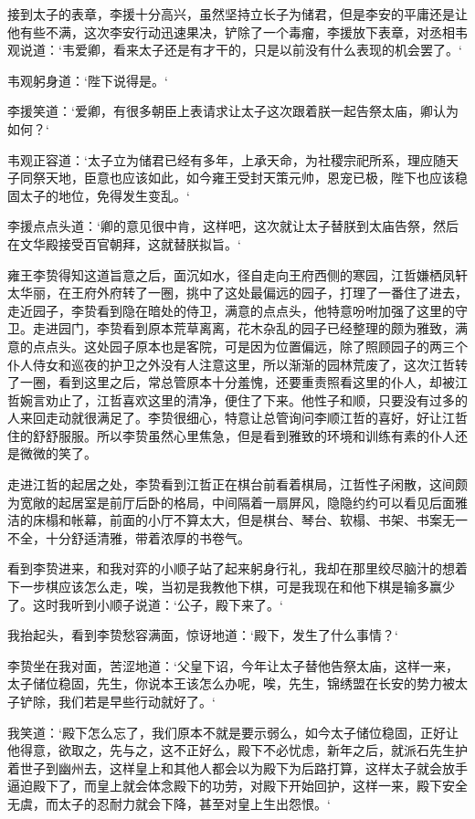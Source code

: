 接到太子的表章，李援十分高兴，虽然坚持立长子为储君，但是李安的平庸还是让他有些不满，这次李安行动迅速果决，铲除了一个毒瘤，李援放下表章，对丞相韦观说道：‘韦爱卿，看来太子还是有才干的，只是以前没有什么表现的机会罢了。‘

韦观躬身道：‘陛下说得是。‘

李援笑道：‘爱卿，有很多朝臣上表请求让太子这次跟着朕一起告祭太庙，卿认为如何？‘

韦观正容道：‘太子立为储君已经有多年，上承天命，为社稷宗祀所系，理应随天子同祭天地，臣意也应该如此，如今雍王受封天策元帅，恩宠已极，陛下也应该稳固太子的地位，免得发生变乱。‘

李援点点头道：‘卿的意见很中肯，这样吧，这次就让太子替朕到太庙告祭，然后在文华殿接受百官朝拜，这就替朕拟旨。‘

雍王李贽得知这道旨意之后，面沉如水，径自走向王府西侧的寒园，江哲嫌栖凤轩太华丽，在王府外府转了一圈，挑中了这处最偏远的园子，打理了一番住了进去，走近园子，李贽看到隐在暗处的侍卫，满意的点点头，他特意吩咐加强了这里的守卫。走进园门，李贽看到原本荒草离离，花木杂乱的园子已经整理的颇为雅致，满意的点点头。这处园子原本也是客院，可是因为位置偏远，除了照顾园子的两三个仆人侍女和巡夜的护卫之外没有人注意这里，所以渐渐的园林荒废了，这次江哲转了一圈，看到这里之后，常总管原本十分羞愧，还要重责照看这里的仆人，却被江哲婉言劝止了，江哲喜欢这里的清净，便住了下来。他性子和顺，只要没有过多的人来回走动就很满足了。李贽很细心，特意让总管询问李顺江哲的喜好，好让江哲住的舒舒服服。所以李贽虽然心里焦急，但是看到雅致的环境和训练有素的仆人还是微微的笑了。

走进江哲的起居之处，李贽看到江哲正在棋台前看着棋局，江哲性子闲散，这间颇为宽敞的起居室是前厅后卧的格局，中间隔着一扇屏风，隐隐约约可以看见后面雅洁的床榻和帐幕，前面的小厅不算太大，但是棋台、琴台、软榻、书架、书案无一不全，十分舒适清雅，带着浓厚的书卷气。

看到李贽进来，和我对弈的小顺子站了起来躬身行礼，我却在那里绞尽脑汁的想着下一步棋应该怎么走，唉，当初是我教他下棋，可是我现在和他下棋是输多赢少了。这时我听到小顺子说道：‘公子，殿下来了。‘

我抬起头，看到李贽愁容满面，惊讶地道：‘殿下，发生了什么事情？‘

李贽坐在我对面，苦涩地道：‘父皇下诏，今年让太子替他告祭太庙，这样一来，太子储位稳固，先生，你说本王该怎么办呢，唉，先生，锦绣盟在长安的势力被太子铲除，我们若是早些行动就好了。‘

我笑道：‘殿下怎么忘了，我们原本不就是要示弱么，如今太子储位稳固，正好让他得意，欲取之，先与之，这不正好么，殿下不必忧虑，新年之后，就派石先生护着世子到幽州去，这样皇上和其他人都会以为殿下为后路打算，这样太子就会放手逼迫殿下了，而皇上就会体念殿下的功劳，对殿下开始回护，这样一来，殿下安全无虞，而太子的忍耐力就会下降，甚至对皇上生出怨恨。‘

